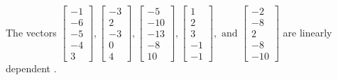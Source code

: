 \begin{exercise}
\begin{exerciseStatement}
  \end{exerciseStatement}
  \begin{exerciseAnswer}
   The vectors \(\left[\begin{array}{r}
-1 \\
-6 \\
-5 \\
-4 \\
3
\end{array}\right] , \left[\begin{array}{r}
-3 \\
2 \\
-3 \\
0 \\
4
\end{array}\right] , \left[\begin{array}{r}
-5 \\
-10 \\
-13 \\
-8 \\
10
\end{array}\right] , \left[\begin{array}{r}
1 \\
2 \\
3 \\
-1 \\
-1
\end{array}\right] , \text{ and } \left[\begin{array}{r}
-2 \\
-8 \\
2 \\
-8 \\
-10
\end{array}\right]\) are 
  	 linearly dependent  .
  


  \end{exerciseAnswer}
\end{exercise}